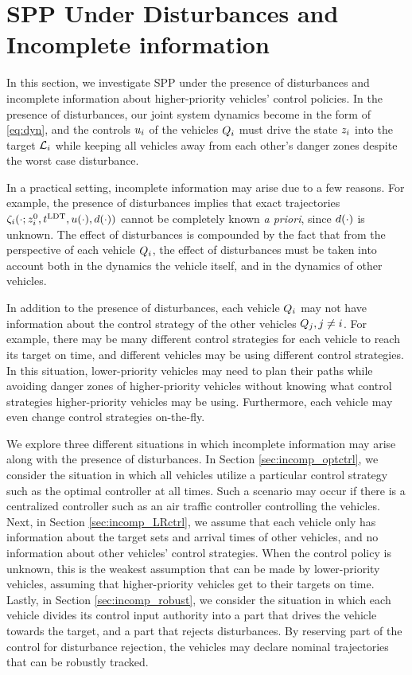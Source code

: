 \section{SPP Under Disturbances and Incomplete information \label{sec:incomp}}
In this section, we investigate SPP under the presence of disturbances and incomplete information about higher-priority vehicles' control policies. In the presence of disturbances, our joint system dynamics become in the form of \eqref{eq:dyn}, and the controls $u_i$ of the vehicles $Q_{i}$ must drive the state $z_i$ into the target $\mathcal{L}_i$ while keeping all vehicles away from each other's danger zones despite the worst case disturbance.

In a practical setting, incomplete information may arise due to a few reasons. For example, the presence of disturbances implies that exact trajectories $\zeta_i(\cdot; z_i^0, t^\text{LDT}, u(\cdot), d(\cdot))$ cannot be completely known \textit{a priori}, since $d(\cdot)$ is unknown. The effect of disturbances is compounded by the fact that from the perspective of each vehicle $Q_{i}$, the effect of disturbances must be taken into account both in the dynamics the vehicle itself, and in the dynamics of other vehicles.

In addition to the presence of disturbances, each vehicle $Q_{i}$ may not have information about the control strategy of the other vehicles $Q_{j}, j\neq i$. For example, there may be many different control strategies for each vehicle to reach its target on time, and different vehicles may be using different control strategies. In this situation, lower-priority vehicles may need to plan their paths while avoiding danger zones of higher-priority vehicles without knowing what control strategies higher-priority vehicles may be using. Furthermore, each vehicle may even change control strategies on-the-fly.

We explore three different situations in which incomplete information may arise along with the presence of disturbances. In Section \ref{sec:incomp_optctrl}, we consider the situation in which all vehicles utilize a particular control strategy such as the optimal controller at all times. Such a scenario may occur if there is a centralized controller such as an air traffic controller controlling the vehicles. Next, in Section \ref{sec:incomp_LRctrl}, we assume that each vehicle only has information about the target sets and arrival times of other vehicles, and no information about other vehicles' control strategies. When the control policy is unknown, this is the weakest assumption that can be made by lower-priority vehicles, assuming that higher-priority vehicles get to their targets on time. Lastly, in Section \ref{sec:incomp_robust}, we consider the situation in which each vehicle divides its control input authority into a part that drives the vehicle towards the target, and a part that rejects disturbances. By reserving part of the control for disturbance rejection, the vehicles may declare nominal trajectories that can be robustly tracked.

